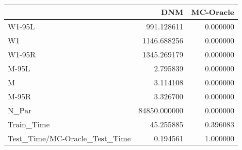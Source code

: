 \begin{tabular}{lrr}
\toprule
{} &           DNM &  MC-Oracle \\
\midrule
W1-95L                        &    991.128611 &   0.000000 \\
W1                            &   1146.688256 &   0.000000 \\
W1-95R                        &   1345.269179 &   0.000000 \\
M-95L                         &      2.795839 &   0.000000 \\
M                             &      3.114108 &   0.000000 \\
M-95R                         &      3.326700 &   0.000000 \\
N\_Par                         &  84850.000000 &   0.000000 \\
Train\_Time                    &     45.255885 &   0.396083 \\
Test\_Time/MC-Oracle\_Test\_Time &      0.194561 &   1.000000 \\
\bottomrule
\end{tabular}

